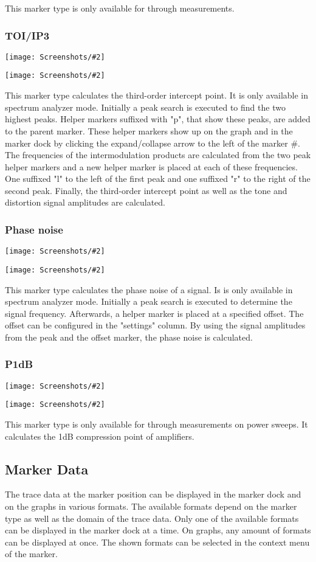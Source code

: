 \documentclass[a4paper,11pt]{article}
\newcommand{\screenshot}[2]{\begin{center}
\texttt{[image: Screenshots/\#2]}
\end{center}}
\begin{document}
This marker type is only available for through measurements.
\subsubsection{TOI/IP3}
\screenshot{1.0}{MarkerTOIGraph.png}
\screenshot{1.0}{MarkerTOITable.png}
This marker type calculates the third-order intercept point. It is only available in spectrum analyzer mode. Initially a peak search is executed to find the two highest peaks. Helper markers suffixed with "p", that show these peaks, are added to the parent marker. These helper markers show up on the graph and in the marker dock by clicking the expand/collapse arrow to the left of the marker #. The frequencies of the intermodulation products are calculated from the two peak helper markers and a new helper marker is placed at each of these frequencies. One suffixed "l" to the left of the first peak and one suffixed "r" to the right of the second peak. Finally, the third-order intercept point as well as the tone and distortion signal amplitudes are calculated.
\subsubsection{Phase noise}
\screenshot{1.0}{MarkerPhasenoiseGraph.png}
\screenshot{1.0}{MarkerPhasenoiseTable.png}
This marker type calculates the phase noise of a signal. Is is only available in spectrum analyzer mode. Initially a peak search is executed to determine the signal frequency. Afterwards, a helper marker is placed at a specified offset. The offset can be configured in the "settings" column. By using the signal amplitudes from the peak and the offset marker, the phase noise is calculated.

\subsubsection{P1dB}
\screenshot{1.0}{MarkerP1dBGraph.png}
\screenshot{1.0}{MarkerP1dBTable.png}
This marker type is only available for through measurements on power sweeps. It calculates the 1dB compression point of amplifiers.

\subsection{Marker Data}
The trace data at the marker position can be displayed in the marker dock and on the graphs in various formats. The available formats depend on the marker type as well as the domain of the trace data. Only one of the available formats can be displayed in the marker dock at a time. On graphs, any amount of formats can be displayed at once. The shown formats can be selected in the context menu of the marker.
\end{document}
